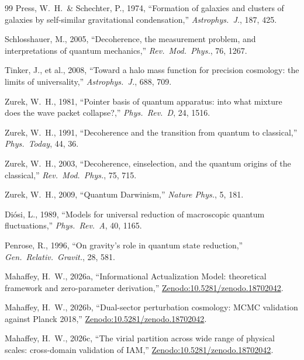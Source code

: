 \documentclass[12pt,a4paper]{article}
\begin{document}
\begin{thebibliography}{99}
Press, W.~H.\ \& Schechter, P., 1974, ``Formation of galaxies and clusters
of galaxies by self-similar gravitational condensation,''
\textit{Astrophys.\ J.}, 187, 425.

Schlosshauer, M., 2005, ``Decoherence, the measurement problem, and
interpretations of quantum mechanics,''
\textit{Rev.\ Mod.\ Phys.}, 76, 1267.

Tinker, J., et al., 2008, ``Toward a halo mass function for precision
cosmology: the limits of universality,''
\textit{Astrophys.\ J.}, 688, 709.

Zurek, W.~H., 1981, ``Pointer basis of quantum apparatus: into what mixture
does the wave packet collapse?,''
\textit{Phys.\ Rev.\ D}, 24, 1516.

Zurek, W.~H., 1991, ``Decoherence and the transition from quantum to
classical,'' \textit{Phys.\ Today}, 44, 36.

Zurek, W.~H., 2003, ``Decoherence, einselection, and the quantum origins
of the classical,'' \textit{Rev.\ Mod.\ Phys.}, 75, 715.

Zurek, W.~H., 2009, ``Quantum Darwinism,''
\textit{Nature Phys.}, 5, 181.

Diósi, L., 1989, ``Models for universal reduction of macroscopic quantum
fluctuations,'' \textit{Phys.\ Rev.\ A}, 40, 1165.

Penrose, R., 1996, ``On gravity's role in quantum state reduction,''
\textit{Gen.\ Relativ.\ Gravit.}, 28, 581.

Mahaffey, H.~W., 2026a, ``Informational Actualization Model: theoretical
framework and zero-parameter derivation,''
\href{https://doi.org/10.5281/zenodo.18702042}{Zenodo:10.5281/zenodo.18702042}.

Mahaffey, H.~W., 2026b, ``Dual-sector perturbation cosmology: MCMC
validation against Planck 2018,''
\href{https://doi.org/10.5281/zenodo.18702042}{Zenodo:10.5281/zenodo.18702042}.

Mahaffey, H.~W., 2026c, ``The virial partition across wide range of
physical scales: cross-domain validation of IAM,''
\href{https://doi.org/10.5281/zenodo.18702042}{Zenodo:10.5281/zenodo.18702042}.


\end{thebibliography}
\end{document}
